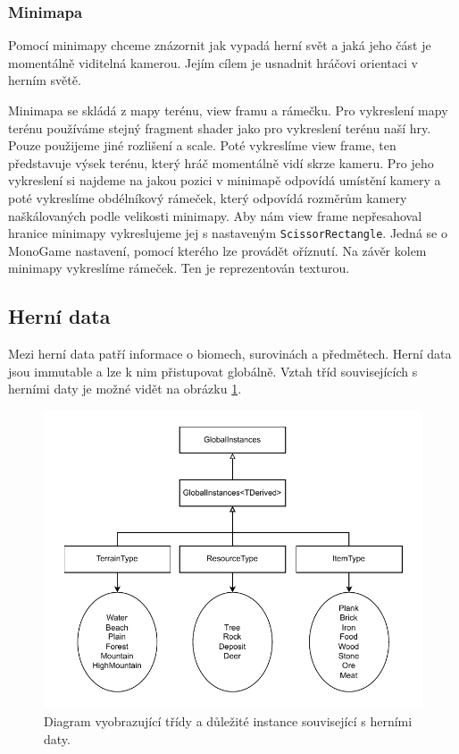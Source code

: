 \subsubsection{Minimapa}
Pomocí minimapy chceme znázornit jak vypadá herní svět a jaká jeho část je momentálně viditelná kamerou. Jejím cílem je usnadnit hráčovi orientaci v herním světě.

Minimapa se skládá z mapy terénu, view framu a rámečku. Pro vykreslení mapy terénu používáme stejný fragment shader jako pro vykreslení terénu naší hry. Pouze použijeme jiné rozlišení a scale. Poté vykreslíme view frame, ten představuje výsek terénu, který hráč momentálně vidí skrze kameru. Pro jeho vykreslení si najdeme na jakou pozici v minimapě odpovídá umístění kamery a poté vykreslíme obdélníkový rámeček, který odpovídá rozměrům kamery naškálovaných podle velikosti minimapy. Aby nám view frame nepřesahoval hranice minimapy vykreslujeme jej s nastaveným \texttt{ScissorRectangle}. Jedná se o MonoGame nastavení, pomocí kterého lze provádět oříznutí. Na závěr kolem minimapy vykreslíme rámeček. Ten je reprezentován texturou.

\subsection{Herní data}
Mezi herní data patří informace o biomech, surovinách a předmětech. Herní data jsou immutable a lze k nim přistupovat globálně. Vztah tříd souvisejících s herními daty je možné vidět na obrázku \ref{fig:game-data}.

\begin{figure}[!htb]
  \centering
  \includegraphics[width=0.7\linewidth]{img/game-data.pdf}
  \caption{Diagram vyobrazující třídy a důležité instance související s herními daty.}
  \label{fig:game-data}
\end{figure}

